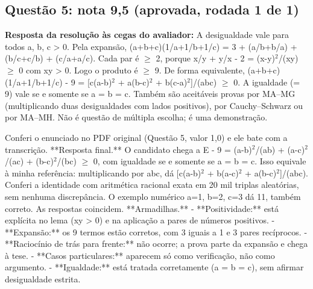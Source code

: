 \documentclass{article}%
\begin{document}
\subsection*{Questão 5: nota 9,5 (aprovada, rodada 1 de 1)}%
\textbf{Resposta da resolução às cegas do avaliador:} A desigualdade vale para todos a, b, c > 0. Pela expansão, (a+b+c)(1/a+1/b+1/c) = 3 + (a/b+b/a) + (b/c+c/b) + (c/a+a/c). Cada par é $\geq$ 2, porque x/y + y/x - 2 = (x-y)$^2$/(xy) $\geq$ 0 com xy > 0. Logo o produto é $\geq$ 9.\newline%
\newline%
De forma equivalente, (a+b+c)(1/a+1/b+1/c) - 9 = {[}c(a-b)$^2$ + a(b-c)$^2$ + b(c-a)$^2${]}/(abc) $\geq$ 0.\newline%
\newline%
A igualdade (= 9) vale se e somente se a = b = c. Também são aceitáveis provas por MA--MG (multiplicando duas desigualdades com lados positivos), por Cauchy--Schwarz ou por MA--MH.\newline%
\newline%
Não é questão de múltipla escolha; é uma demonstração.\par %
Conferi o enunciado no PDF original (Questão 5, valor 1,0) e ele bate com a transcrição.\newline%
\newline%
**Resposta final.** O candidato chega a E - 9 = (a-b)$^2$/(ab) + (a-c)$^2$/(ac) + (b-c)$^2$/(bc) $\geq$ 0, com igualdade se e somente se a = b = c. Isso equivale à minha referência: multiplicando por abc, dá {[}c(a-b)$^2$ + b(a-c)$^2$ + a(b-c)$^2${]}/(abc). Conferi a identidade com aritmética racional exata em 20 mil triplas aleatórias, sem nenhuma discrepância. O exemplo numérico a=1, b=2, c=3 dá 11, também correto. As respostas coincidem.\newline%
\newline%
**Armadilhas.**\newline%
{-} **Positividade:** está explícita no lema (xy > 0) e na aplicação a pares de números positivos.\newline%
{-} **Expansão:** os 9 termos estão corretos, com 3 iguais a 1 e 3 pares recíprocos.\newline%
{-} **Raciocínio de trás para frente:** não ocorre; a prova parte da expansão e chega à tese.\newline%
{-} **Casos particulares:** aparecem só como verificação, não como argumento.\newline%
{-} **Igualdade:** está tratada corretamente (a = b = c), sem afirmar desigualdade estrita.\newline%
\end{document}
